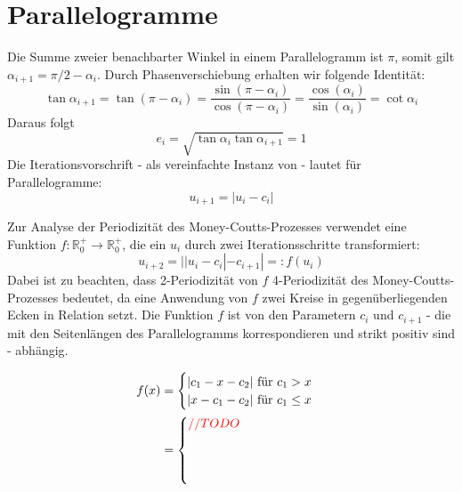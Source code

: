 \chapter{Parallelogramme}

Die Summe zweier benachbarter Winkel in einem Parallelogramm ist $\pi$,
somit gilt $\alpha_{i+1} = \pi/2 - \alpha_i$.
Durch Phasenverschiebung erhalten wir folgende Identität:
\begin{equation*}
    \tan\alpha_{i+1}  = \tan(\pi - \alpha_i)
    = \frac{\sin(\pi - \alpha_i)}{\cos(\pi - \alpha_i)}
    = \frac{\cos(\alpha_i)}{\sin(\alpha_i)}
    = \cot\alpha_i
\end{equation*}
Daraus folgt
\begin{equation*}
    e_i = \sqrt{\tan\alpha_i \tan \alpha_{i+1}} = 1
\end{equation*}
Die Iterationsvorschrift - als vereinfachte Instanz von  - lautet für Parallelogramme:
\begin{equation*}
    u_{i+1}=|u_i - c_i|
\end{equation*}

Zur Analyse der Periodizität des Money-Coutts-Prozesses verwendet \citet{Troub2000}
eine Funktion $f:\mathbb{R}_0^+ \to \mathbb{R}_0^+$, die ein $u_i$ durch zwei Iterationsschritte transformiert:
\begin{equation*}
    u_{i+2}=||u_i-c_i|-c_{i+1}| =: f(u_i)
\end{equation*}
Dabei ist zu beachten, dass 2-Periodizität von $f$ 4-Periodizität des Money-Coutts-Prozesses bedeutet,
da eine Anwendung von $f$ zwei Kreise in gegenüberliegenden Ecken in Relation setzt.
Die Funktion $f$ ist von den Parametern $c_i$ und $c_{i+1}$ - die mit den Seitenlängen des Parallelogramms korrespondieren und strikt positiv sind - abhängig.

\begin{align}
    f(x) & = \begin{cases}
                 |c_1-x-c_2| \text{ für } c_1 > x \\
                 |x-c_1-c_2| \text{ für } c_1 \leq x
             \end{cases} \\
         & =\begin{cases}
                \color{red} // TODO \\
                \\
                \\
                \\
            \end{cases}
    \label{parallelogram:cases}
\end{align}

